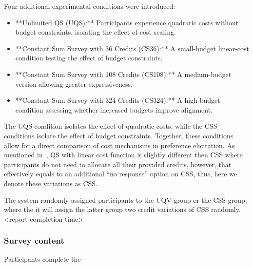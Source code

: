Four additional experimental conditions were introduced:  
\begin{itemize}
    \item **Unlimited QS (UQS):** Participants experience quadratic costs without budget constraints, isolating the effect of cost scaling.
    \item **Constant Sum Survey with 36 Credits (CS36):** A small-budget linear-cost condition testing the effect of budget constraints.
    \item **Constant Sum Survey with 108 Credits (CS108):** A medium-budget version allowing greater expressiveness.
    \item **Constant Sum Survey with 324 Credits (CS324):** A high-budget condition assessing whether increased budgets improve alignment.
\end{itemize}

The UQS condition isolates the effect of quadratic costs, while the CSS conditions isolate the effect of budget constraints. Together, these conditions allow for a direct comparison of cost mechanisms in preference elicitation. As mentioned in~, QS with linear cost function is slightly different then CSS where participants do not need to allocate all their provided credits, however, that effectively equals to an additional ``no response'' option on CSS, thus, here we denote these variations as CSS.

The system randomly assigned participants to the UQV group or the CSS group, where the it will assign the latter group two credit variations of CSS randomly. <report completion time> 

\subsubsection{Survey content}
Participants complete the 



